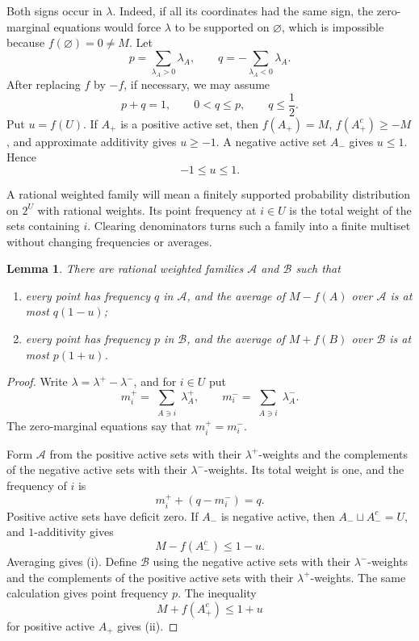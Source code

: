 \documentclass[11pt,a4paper]{amsart}
\newtheorem{lemma}[theorem]{Lemma}
\newcommand{\cA}{\mathcal A}
\newcommand{\cB}{\mathcal B}
\begin{document}
Both signs occur in \(\lambda\).  Indeed, if all its coordinates had the same sign, the
zero-marginal equations would force \(\lambda\) to be supported on
\(\varnothing\), which is impossible because \(f(\varnothing)=0\neq M\).
Let
\[
 p=\sum_{\lambda_A>0}\lambda_A,
 \qquad
 q=-\sum_{\lambda_A<0}\lambda_A.
\]
After replacing \(f\) by \(-f\), if necessary, we may assume
\begin{equation}\label{eq:pq}
        p+q=1,\qquad 0<q\leqslant p,\qquad q\leqslant\frac12.
\end{equation}
Put \(u=f(U)\).  If \(A_+\) is a positive active set, then
\(f(A_+)=M\), \(f(A_+^c)\geqslant-M\), and approximate additivity gives
\(u\geqslant-1\).  A negative active set \(A_-\) gives
\(u\leqslant1\).  Hence
\begin{equation}\label{eq:u}
        -1\leqslant u\leqslant1.
\end{equation}

A rational weighted family will mean a finitely supported probability
distribution on \(2^U\) with rational weights.  Its point frequency at
\(i\in U\) is the total weight of the sets containing \(i\).  Clearing
denominators turns such a family into a finite multiset without changing
frequencies or averages.

\begin{lemma}\label{lem:extremal-families}
There are rational weighted families \(\cA\) and \(\cB\) such that
\begin{enumerate}[label=\textup{(\roman*)}]
\item every point has frequency \(q\) in \(\cA\), and the average of
      \(M-f(A)\) over \(\cA\) is at most \(q(1-u)\);
\item every point has frequency \(p\) in \(\cB\), and the average of
      \(M+f(B)\) over \(\cB\) is at most \(p(1+u)\).
\end{enumerate}
\end{lemma}

\begin{proof}
Write \(\lambda=\lambda^+-\lambda^-\), and for \(i\in U\) put
\[
 m_i^+=\sum_{\substack{A\ni i}}\lambda_A^+,
 \qquad
 m_i^-=\sum_{\substack{A\ni i}}\lambda_A^-.
\]
The zero-marginal equations say that \(m_i^+=m_i^-\).

Form \(\cA\) from the positive active sets with their \(\lambda^+\)-weights
and the complements of the negative active sets with their
\(\lambda^-\)-weights.  Its total weight is one, and the frequency of \(i\)
is
\[
        m_i^++(q-m_i^-)=q.
\]
Positive active sets have deficit zero.  If \(A_-\) is negative active, then
\(A_-\sqcup A_-^c=U\), and \(1\)-additivity gives
\[
        M-f(A_-^c)\leqslant1-u.
\]
Averaging gives (i).  Define \(\cB\) using the negative active sets with
their \(\lambda^-\)-weights and the complements of the positive active sets
with their \(\lambda^+\)-weights.  The same calculation gives point
frequency \(p\).
The inequality
\[
        M+f(A_+^c)\leqslant1+u
\]
for positive active \(A_+\) gives (ii).
\end{proof}
\end{document}

